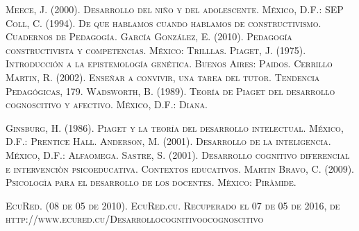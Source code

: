\documentclass{bmcart}
\begin{document}
\begin{backmatter}




\newpage
\renewcommand{\refname}{Referencias}\begin{thebibliography}{X}
 \textsc{Meece, J. (2000). Desarrollo del niño y del adolescente. México, D.F.: SEP}
 \textsc{Coll, C. (1994). De que hablamos cuando hablamos de constructivismo. Cuadernos de Pedagogía.}
 \textsc{García González, E. (2010). Pedagogía constructivista y competencias. México: Trilllas.}
 \textsc{Piaget, J. (1975). Introducción a la epistemología genética. Buenos Aires: Paidos.}
 \textsc{Cerrillo Martin, R. (2002). Enseñar a convivir, una tarea del tutor. Tendencia Pedagógicas, 179.}
 \textsc{Wadsworth, B. (1989). Teoría de Piaget del desarrollo cognoscitivo y afectivo. México, D.F.: Diana.}

 \textsc{Ginsburg, H. (1986). Piaget y la teoría del desarrollo intelectual. México, D.F.: Prentice Hall.
}
 \textsc{Anderson, M. (2001). Desarrollo de la inteligencia. México, D.F.: Alfaomega.}
 \textsc{Sastre, S. (2001). Desarrollo cognitivo diferencial e intervenciòn psicoeducativa. Contextos educativos.}
 \textsc{Martin Bravo, C. (2009). Psicologìa para el desarrollo de los docentes. Mèxico: Piràmide.
}

 \textsc{EcuRed. (08 de 05 de 2010). EcuRed.cu. Recuperado el 07 de 05 de 2016, de http://www.ecured.cu/Desarrollocognitivoocognoscitivo
}
\end{thebibliography}



\end{backmatter}
\end{document}
